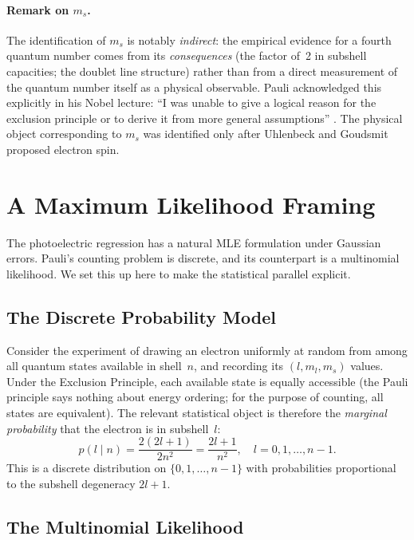 \documentclass[12pt]{article}
\begin{document}
\paragraph{Remark on $m_s$.}
The identification of $m_s$ is notably \emph{indirect}: the empirical evidence
for a fourth quantum number comes from its \emph{consequences} (the factor of~2
in subshell capacities; the doublet line structure) rather than from a direct
measurement of the quantum number itself as a physical observable.  Pauli
acknowledged this explicitly in his Nobel lecture: ``I was unable to give a
logical reason for the exclusion principle or to derive it from more general
assumptions'' \citep{Pauli1946Nobel}.  The physical object
corresponding to $m_s$ was identified only after Uhlenbeck and Goudsmit proposed
electron spin.

\section{A Maximum Likelihood Framing}
\label{sec:mle}

The photoelectric regression has a natural MLE formulation under Gaussian
errors.  Pauli's counting problem is discrete, and its counterpart is a
multinomial likelihood.  We set this up here to make the statistical parallel
explicit.

\subsection{The Discrete Probability Model}

Consider the experiment of drawing an electron uniformly at random from among
all quantum states available in shell~$n$, and recording its $(l, m_l, m_s)$
values.  Under the Exclusion Principle, each available state is equally
accessible (the Pauli principle says nothing about energy ordering; for the
purpose of counting, all states are equivalent).  The relevant statistical
object is therefore the \emph{marginal probability} that the electron is in
subshell~$l$:
\begin{equation}\label{eq:marginal}
  p(l \mid n) = \frac{2(2l+1)}{2n^2}
              = \frac{2l+1}{n^2},
  \quad l=0,1,\ldots,n-1.
\end{equation}
This is a discrete distribution on $\{0,1,\ldots,n-1\}$ with probabilities
proportional to the subshell degeneracy $2l+1$.

\subsection{The Multinomial Likelihood}
\end{document}
